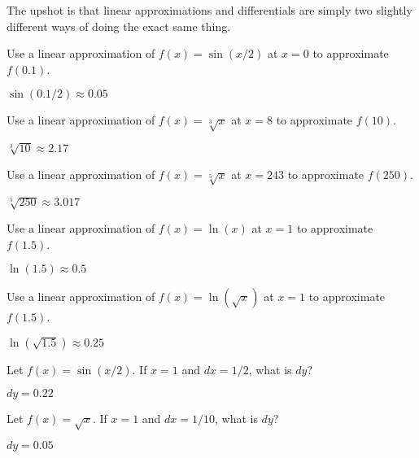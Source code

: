 The upshot is that linear approximations and differentials are simply
two slightly different ways of doing the exact same thing.





\begin{exercises}

\begin{exercise}
Use a linear approximation of $f(x) =\sin(x/2)$ at $x=0$ to approximate
$f(0.1)$.
\begin{answer}
$\sin(0.1/2)\approx 0.05$
\end{answer}
\end{exercise}

\begin{exercise}
Use a linear approximation of $f(x) =\sqrt[3]{x}$ at $x=8$ to approximate
$f(10)$.
\begin{answer}
$\sqrt[3]{10}\approx 2.17$
\end{answer}
\end{exercise}

\begin{exercise}
Use a linear approximation of $f(x) =\sqrt[5]{x}$ at $x=243$ to approximate
$f(250)$.
\begin{answer}
$\sqrt[5]{250}\approx 3.017$
\end{answer}
\end{exercise}


\begin{exercise}
Use a linear approximation of $f(x) =\ln(x)$ at $x=1$ to approximate
$f(1.5)$.
\begin{answer}
$\ln(1.5)\approx 0.5$
\end{answer}
\end{exercise}

\begin{exercise}
Use a linear approximation of $f(x) =\ln(\sqrt{x})$ at $x=1$ to approximate
$f(1.5)$.
\begin{answer}
$\ln(\sqrt{1.5})\approx 0.25$
\end{answer}
\end{exercise}


\begin{exercise} 
Let $f(x) = \sin(x/2)$. If $x=1$ and $dx=1/2$, what is $dy$?
\begin{answer} $dy=0.22$
\end{answer}\end{exercise}

\begin{exercise} 
Let $f(x) = \sqrt{x}$. If $x=1$ and $dx =1/10$, what is $dy$?
\begin{answer} $dy=0.05$
\end{answer}\end{exercise}


\end{exercises}
